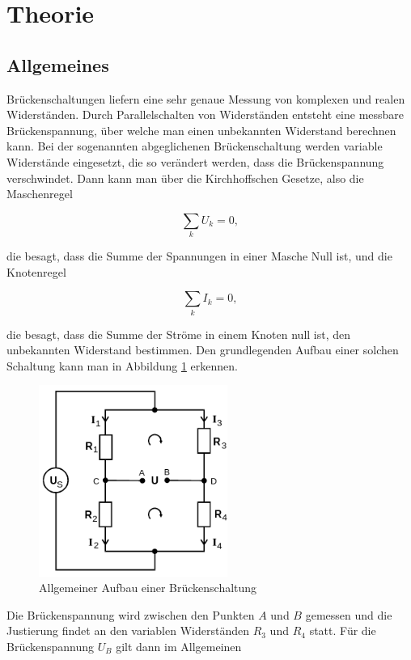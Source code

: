 \section{Theorie}
\label{sec:Theorie}


\subsection{Allgemeines}
Brückenschaltungen liefern eine sehr genaue Messung von komplexen und
realen Widerständen. Durch Parallelschalten von Widerständen entsteht eine
messbare Brückenspannung, über welche man einen unbekannten Widerstand
berechnen kann.
Bei der sogenannten abgeglichenen Brückenschaltung werden variable
Widerstände eingesetzt, die so verändert werden, dass die Brückenspannung
verschwindet.
Dann kann man über die Kirchhoffschen Gesetze, also die Maschenregel

\begin{equation}
  \sum_k U_k = 0,
\end{equation}

die besagt, dass die Summe der Spannungen in einer Masche Null ist,
und die Knotenregel

\begin{equation}
  \sum_k I_k = 0,
\end{equation}

die besagt, dass die Summe der Ströme in einem Knoten null ist, den unbekannten
Widerstand bestimmen.
Den grundlegenden Aufbau einer solchen Schaltung kann man in Abbildung
\ref{fig:AllgBr} erkennen.

\begin{figure}[h]
  \centering
  \includegraphics[height=6.25cm]{AllgBr.png}
  \caption{Allgemeiner Aufbau einer Brückenschaltung}
  \label{fig:AllgBr}
\end{figure}

Die Brückenspannung wird zwischen den Punkten $A$ und $B$ gemessen und die
Justierung findet an den variablen Widerständen $R_3$ und $R_4$ statt.
Für die Brückenspannung $U_B$ gilt dann im Allgemeinen


